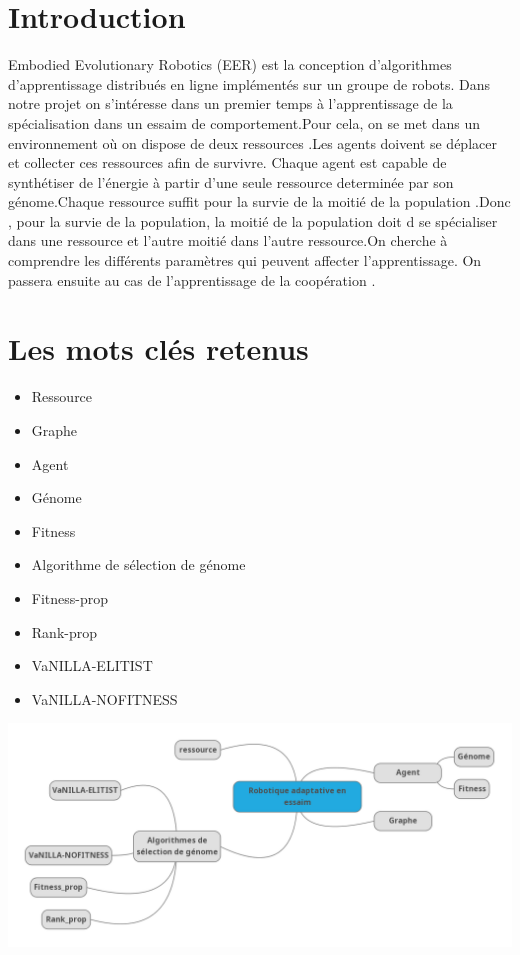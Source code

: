 \documentclass[11pt]{article}
\begin{document}
\begin{flushleft}
\section{Introduction}
 Embodied Evolutionary Robotics (EER) est la conception d’algorithmes d'apprentissage distribués en ligne implémentés  sur un groupe de robots. Dans notre projet on s'intéresse dans un premier temps à l'apprentissage de la spécialisation dans un essaim de comportement.Pour cela, on se met dans un environnement où on dispose de deux ressources .Les agents doivent se déplacer et collecter ces ressources afin de survivre. Chaque agent est capable de synthétiser de l'énergie à partir d'une seule ressource determinée par son génome.Chaque ressource suffit pour la survie de la moitié de la population .Donc , pour la survie de la population, la moitié de la population doit d se spécialiser dans une ressource et l'autre moitié dans l'autre ressource.On cherche à comprendre les différents paramètres qui peuvent affecter l'apprentissage. On passera ensuite au cas de l'apprentissage de la coopération .

\section{Les mots clés retenus}

 \begin{itemize} \item Ressource   \item Graphe  \item Agent\item Génome \item Fitness   \item Algorithme de sélection de génome  \item Fitness-prop \item Rank-prop  \item VaNILLA-ELITIST  \item VaNILLA-NOFITNESS 
  \end{itemize} 
\includegraphics[scale=0.4]{carte.png} 


\end{flushleft}
\end{document}
